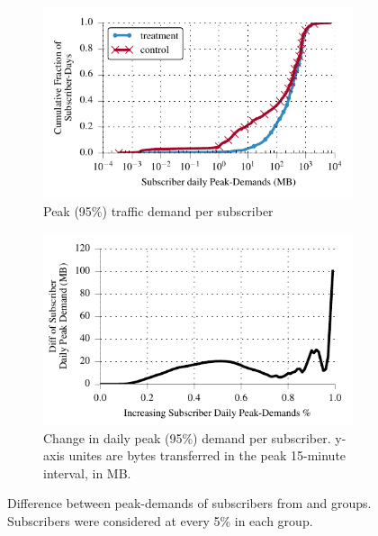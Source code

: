 \begin{figure}[t]
\begin{minipage}{1\linewidth}
\centering
\begin{subfigure}[b]{1\linewidth}
 \includegraphics[width=\linewidth]{figures/cdf_peak_demand-daily.pdf}
                \caption{Peak (95\%) traffic demand per subscriber\label{fig:CDF-data-rate-daily-perc95}}
 \end{subfigure}
\begin{subfigure}[b]{.99\linewidth}
\includegraphics[width=\linewidth]{figures/diff_perc95_bytes_subsc-daily-overall_01.pdf}		%
                \caption{Change in daily peak (95\%) demand per subscriber. y-axis unites
                  are bytes transferred in the peak 15-minute
                  interval, in MB.\label{fig:diff-peak-daily}} 
\end{subfigure}
%
\end{minipage}
  \caption{Difference between peak-demands of subscribers from \treatment{} and
  \control{} groups. Subscribers were considered at every 5\% in each
  group. 
  \label{fig:traffic-demand-daily}}
\end{figure}


